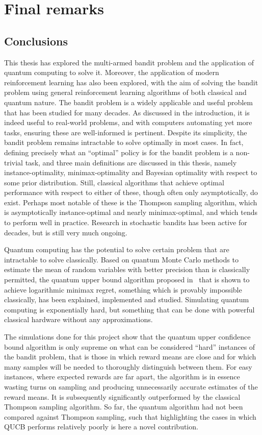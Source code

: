 \chapter{Final remarks}
\label{chap:final}

\section{Conclusions}
This thesis has explored the multi-armed bandit problem and the application of quantum computing to solve it.
Moreover, the application of modern reinforcement learning has also been explored, with the aim of solving the bandit problem using general reinforcement learning algorithms of both classical and quantum nature.
The bandit problem is a widely applicable and useful problem that has been studied for many decades.
As discussed in the introduction, it is indeed useful to real-world problems, and with computers automating yet more tasks, ensuring these are well-informed is pertinent.
Despite its simplicity, the bandit problem remains intractable to solve optimally in most cases.
In fact, defining precisely what an \enquote{optimal} policy is for the bandit problem is a non-trivial task, and three main definitions are discussed in this thesis, namely instance-optimality, minimax-optimality and Bayesian optimality with respect to some prior distribution.
Still, classical algorithms that achieve optimal performance with respect to either of these, though often only asymptotically, do exist.
Perhaps most notable of these is the Thompson sampling algorithm, which is asymptotically instance-optimal and nearly minimax-optimal, and which tends to perform well in practice.
Research in stochastic bandits has been active for decades, but is still very much ongoing.

Quantum computing has the potential to solve certain problem that are intractable to solve classically.
Based on quantum Monte Carlo methods to estimate the mean of random variables with better precision than is classically permitted, the quantum upper bound algorithm proposed in~\autocite{wan2022} that is shown to achieve logarithmic minimax regret, something which is provably impossible classically, has been explained, implemented and studied.
Simulating quantum computing is exponentially hard, but something that can be done with powerful classical hardware without any approximations.

The simulations done for this project show that the quantum upper confidence bound algorithm is only supreme on what can be considered \enquote{hard} instances of the bandit problem, that is those in which reward means are close and for which many samples will be needed to thoroughly distinguish between them.
For easy instances, where expected rewards are far apart, the algorithm is in essence wasting turns on sampling and producing unnecessarily accurate estimates of the reward means.
It is subsequently significantly outperformed by the classical Thompson sampling algorithm.
So far, the quantum algorithm had not been compared against Thompson sampling, such that highlighting the cases in which QUCB performs relatively poorly is here a novel contribution.

